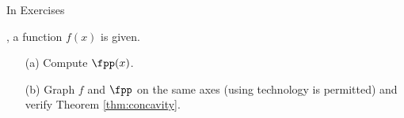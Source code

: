 {\noindent In Exercises}
{, a function $f(x)$ is given.
	\begin{enumerate}
	\item	[(a)] Compute $\fpp(x)$.
	\item	[(b)] Graph $f$ and $\fpp$ on the same axes (using technology is permitted) and verify Theorem \ref{thm:concavity}.
	\end{enumerate}
}
